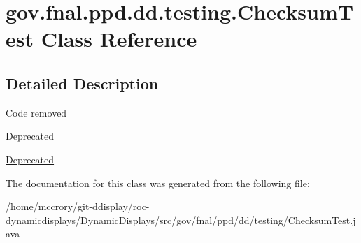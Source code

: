 \hypertarget{classgov_1_1fnal_1_1ppd_1_1dd_1_1testing_1_1ChecksumTest}{\section{gov.\-fnal.\-ppd.\-dd.\-testing.\-Checksum\-Test Class Reference}
\label{classgov_1_1fnal_1_1ppd_1_1dd_1_1testing_1_1ChecksumTest}
}


\subsection{Detailed Description}
Code removed \begin{DoxyRefDesc}{Deprecated}
\item[\hyperlink{deprecated__deprecated000003}{Deprecated}]\end{DoxyRefDesc}


The documentation for this class was generated from the following file\-:\begin{DoxyCompactItemize}
\item 
/home/mccrory/git-\/ddisplay/roc-\/dynamicdisplays/\-Dynamic\-Displays/src/gov/fnal/ppd/dd/testing/Checksum\-Test.\-java\end{DoxyCompactItemize}

